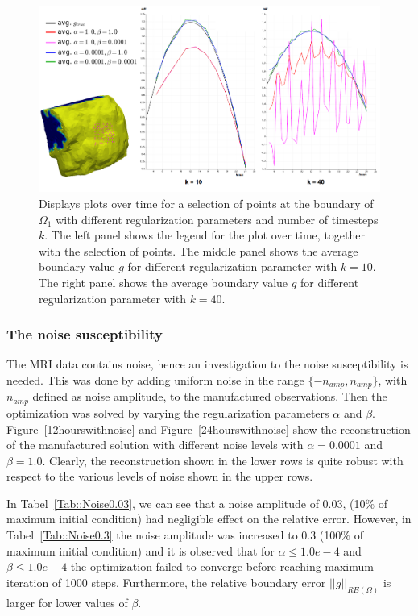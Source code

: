 \documentclass[11pt,a4paper]{article}
\begin{document}
\begin{figure}
\centering
\includegraphics[scale=0.2]{boundary_control.png}  
\caption{ Displays plots over time for a selection of points at the boundary of $\Omega_1$ with different regularization parameters and number of timesteps $k$. The left panel shows the legend for the plot over time, together with the selection of points. The middle panel shows the average boundary value $g$ for different regularization parameter with $k=10$. The right panel shows the average boundary value $g$ for different regularization parameter with $k=40$. }
\label{boundarycontrol}
\end{figure}

\subsubsection{The noise susceptibility}
The MRI data contains noise, hence an investigation to the noise susceptibility is needed. This was done by adding uniform noise in the range $\lbrace -n_{amp} , n_{amp} \rbrace $, with $n_{amp}$ defined as noise amplitude, to the manufactured observations. Then the optimization was solved by varying the regularization parameters $\alpha$ and $\beta$. Figure~\ref{12hourswithnoise} and Figure~\ref{24hourswithnoise} show the reconstruction of the manufactured solution with 
different noise levels with $\alpha=0.0001$ and $\beta=1.0$. Clearly, the reconstruction shown in the lower rows is quite robust with respect to the various levels
of noise shown in the upper rows.      

In Tabel~\ref{Tab::Noise0.03}, we can see that a noise amplitude of 0.03, (10$\%$ of maximum initial condition) had negligible effect on the relative error. However, in Tabel~\ref{Tab::Noise0.3} the noise amplitude was increased to 0.3 (100$\%$ of maximum initial condition) and it is observed that for  $\alpha \leq 1.0e-4$  and $\beta \leq 1.0e-4$ the optimization failed to converge before reaching maximum iteration of 1000 steps. Furthermore, the relative boundary error $||g||_{RE(\Omega)}$ is  larger for lower values of $\beta$. 
\end{document}
